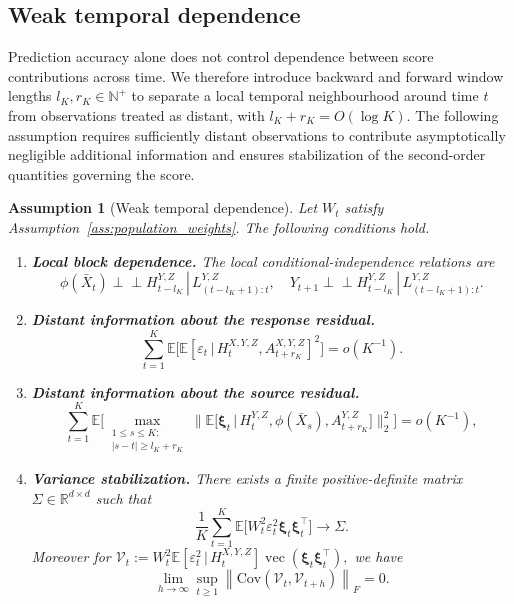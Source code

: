 \documentclass[12pt]{article}
\def\E{\mathbb{E}}
\newtheorem{assumption}[theorem]{Assumption}
\newcommand{\indep}{\perp \!\!\! \perp}
\newcommand{\Cov}{\mathrm{Cov}}
\newcommand\given{\,|\,}
\numberwithin{equation}{section}
\begin{document}
\subsection{Weak temporal dependence}

Prediction accuracy alone does not control dependence between score contributions across time. We therefore introduce backward and forward window lengths \(l_K,r_K\in\mathbb N^+\) to separate a local temporal neighbourhood around time \(t\) from observations treated as distant, with \(l_K+r_K=O(\log K)\). The following assumption requires sufficiently distant observations to contribute asymptotically negligible additional information and ensures stabilization of the second-order quantities governing the score.

\begin{assumption}[Weak temporal dependence]
\label{ass:mixing}
Let \(W_t\) satisfy Assumption~\ref{ass:population_weights}.
The following conditions hold.
\begin{enumerate}
\item[(i)] \textbf{Local block dependence.}
The local conditional-independence relations are
\[
\phi(\bar X_t)\indep H^{Y,Z}_{t-l_K}
\given L^{Y,Z}_{(t-l_K+1):t},\quad
Y_{t+1}\indep H^{Y,Z}_{t-l_K}
\given L^{Y,Z}_{(t-l_K+1):t}.
\]
\item[(ii)] \textbf{Distant information about the response residual.}
\begin{equation}
\label{eq:epsilon-mixing}
\sum_{t=1}^K
\E\big[
\E[\varepsilon_t\given H_t^{X,Y,Z},A_{t+r_K}^{X,Y,Z}]^2
\big]=o(K^{-1}).
\end{equation}

\item[(iii)] \textbf{Distant information about the source residual.}
\begin{equation}
\label{eq:xi-mixing}
\sum_{t=1}^K
\E\Big[
\max_{\substack{1\le s\le K:\\|s-t|\ge l_K+r_K}}
\big\|
\E\big[\boldsymbol\xi_t\given
H_t^{Y,Z},\phi(\bar X_s),A_{t+r_K}^{Y,Z}\big]
\big\|_2^2
\Big]=o(K^{-1}),
\end{equation}

\item[(iv)] \textbf{Variance stabilization.}
There exists a finite positive-definite matrix
\(\Sigma\in\mathbb R^{d\times d}\) such that
\begin{equation}
\label{eq:oracle-unconditional-covariance-limit}
\frac1K\sum_{t=1}^K
\E\big[W_t^2\varepsilon_t^2
\boldsymbol\xi_t\boldsymbol\xi_t^\top\big]
\longrightarrow\Sigma.
\end{equation}
\sloppy
Moreover for $\mathcal V_t
:=
W_t^2\E[\varepsilon_t^2\given H_t^{X, Y,Z}]
\operatorname{vec}(\boldsymbol\xi_t\boldsymbol\xi_t^\top),$ we have
\begin{equation}
\label{eq:2-mixing}
    \lim_{h\to\infty}
\sup_{t \geq 1}
{\left\|
\Cov(\mathcal V_t,\mathcal V_{t+h})
\right\|_F}
=0 .
\end{equation}
\end{enumerate}
\end{assumption}
\end{document}
